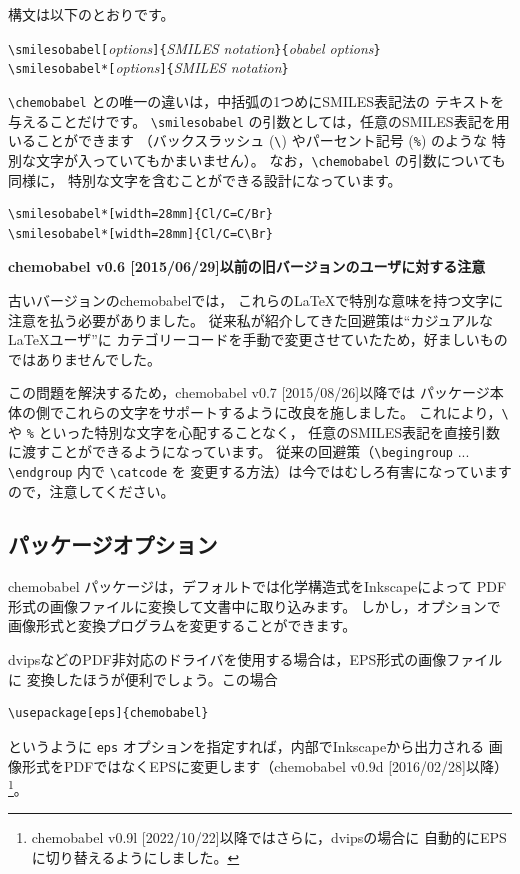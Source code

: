\documentclass[12pt]{ltjsarticle}
\def\Lpack#1{\textsf{#1}}
\def\Lmeta#1{\textit{#1}}
\def\Lver#1{\Lpack{chemobabel} #1}
\begin{document}
構文は以下のとおりです。
\begin{center}
\verb|\smilesobabel[|\Lmeta{options}\verb|]{|\Lmeta{SMILES notation}\verb|}{|\Lmeta{obabel options}\verb|}| \\
\verb|\smilesobabel*[|\Lmeta{options}\verb|]{|\Lmeta{SMILES notation}\verb|}|
\end{center}
\verb|\chemobabel| との唯一の違いは，中括弧の1つめにSMILES表記法の
テキストを与えることだけです。
\verb|\smilesobabel| の引数としては，任意のSMILES表記を用いることができます
（バックスラッシュ (\verb|\|) やパーセント記号 (\verb|%|) のような
特別な文字が入っていてもかまいません）。
なお，\verb|\chemobabel| の引数についても同様に，
特別な文字を含むことができる設計になっています。
\begin{verbatim}
\smilesobabel*[width=28mm]{Cl/C=C/Br}
\smilesobabel*[width=28mm]{Cl/C=C\Br}
\end{verbatim}
\begin{figure}[h]
  \centering
   \quad
\end{figure}


\noindent \textbf{\Lver{v0.6 [2015/06/29]}以前の旧バージョンのユーザに対する注意}

古いバージョンの\Lpack{chemobabel}では，
これらの\LaTeX で特別な意味を持つ文字に注意を払う必要がありました。
従来私が紹介してきた回避策は“カジュアルな \LaTeX ユーザ”に
カテゴリーコードを手動で変更させていたため，好ましいものではありませんでした。

この問題を解決するため，\Lver{v0.7 [2015/08/26]}以降では
パッケージ本体の側でこれらの文字をサポートするように改良を施しました。
これにより，\verb|\| や \verb|%| といった特別な文字を心配することなく，
任意のSMILES表記を直接引数に渡すことができるようになっています。
従来の回避策（\verb|\begingroup| ... \verb|\endgroup| 内で \verb|\catcode| を
変更する方法）は今ではむしろ有害になっていますので，注意してください。

\clearpage

\subsection{パッケージオプション}

\Lpack{chemobabel} パッケージは，デフォルトでは化学構造式をInkscapeによって
PDF形式の画像ファイルに変換して文書中に取り込みます。
しかし，オプションで画像形式と変換プログラムを変更することができます。

dvipsなどのPDF非対応のドライバを使用する場合は，EPS形式の画像ファイルに
変換したほうが便利でしょう。この場合
\begin{verbatim}
\usepackage[eps]{chemobabel}
\end{verbatim}
というように \verb|eps| オプションを指定すれば，内部でInkscapeから出力される
画像形式をPDFではなくEPSに変更します（\Lver{v0.9d [2016/02/28]}以降）
\footnote{\Lver{v0.9l [2022/10/22]}以降ではさらに，dvipsの場合に
自動的にEPSに切り替えるようにしました。}。
\end{document}
